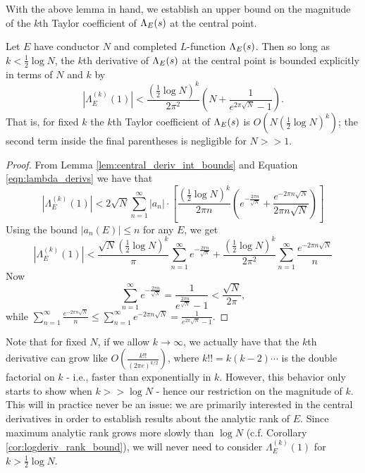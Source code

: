 With the above lemma in hand, we establish an upper bound on the magnitude of the $k$th Taylor coefficient of $\Lambda_E(s)$ at the central point.
\begin{proposition}\label{prop:central_deriv_bounds}
Let $E$ have conductor $N$ and completed $L$-function $\Lambda_E(s)$. Then so long as $k<\frac{1}{2}\log N$, the $k$th derivative of $\Lambda_E(s)$ at the central point is bounded explicitly in terms of $N$ and $k$ by
\begin{equation}
\left| \Lambda_E^{(k)}(1)\right| < \frac{(\frac{1}{2}\log N)^k}{2\pi^2}\left(N + \frac{1}{e^{2\pi\sqrt{N}}-1} \right).
\end{equation}
That is, for fixed $k$ the $k$th Taylor coefficient of $\Lambda_E(s)$ is $O\left( N(\frac{1}{2}\log N)^k\right)$; the second term inside the final parentheses is negligible for $N>>1$.
\end{proposition}

\begin{proof}
From Lemma \ref{lem:central_deriv_int_bounds} and Equation \ref{eqn:lambda_derivs} we have that
\begin{equation*}
\left| \Lambda_E^{(k)}(1)\right| < 2 \sqrt{N} \sum_{n=1}^{\infty} |a_n| \cdot \left[\frac{\left(\frac{1}{2} \log N\right)^{k}}{2\pi n}\left( e^{-\frac{2\pi n}{\sqrt{N}}} + \frac{e^{-2\pi n\sqrt{N}}}{2\pi n \sqrt N} \right)\right]
\end{equation*}
Using the bound $|a_n(E)| \le n$ for any $E$, we get
\begin{equation*}
\left| \Lambda_E^{(k)}(1)\right| < \frac{ \sqrt{N}\left(\frac{1}{2} \log N\right)^{k}}{\pi} \sum_{n=1}^{\infty} e^{-\frac{2\pi n}{\sqrt{N}}} + \frac{\left(\frac{1}{2} \log N\right)^{k}}{2\pi^2} \sum_{n=1}^{\infty} \frac{e^{-2\pi n\sqrt{N}}}{n}
\end{equation*}
Now
\begin{equation*}
\sum_{n=1}^{\infty} e^{-\frac{2\pi n}{\sqrt{N}}} = \frac{1}{e^{\frac{2\pi n}{\sqrt{N}}}-1}< \frac{\sqrt{N}}{2\pi},
\end{equation*}
while $\sum_{n=1}^{\infty} \frac{e^{-2\pi n\sqrt{N}}}{n} \le \sum_{n=1}^{\infty} e^{-2\pi n\sqrt{N}} = \frac{1}{e^{2\pi\sqrt{N}}-1}$.
\end{proof}

Note that for fixed $N$, if we allow $k \to \infty$, we actually have that the $k$th derivative can grow like $O\left(\frac{k!!}{(2\pi e)^{k/2}}\right)$, where $k!! = k(k-2)\cdots$ is the double factorial on $k$ - i.e., faster than exponentially in $k$. However, this behavior only starts to show when $k>>\log N$ - hence our restriction on the magnitude of $k$. This will in practice never be an issue: we are primarily interested in the central derivatives in order to establish results about the analytic rank of $E$. Since maximum analytic rank grows more slowly than $\log N$ (c.f. Corollary \ref{cor:logderiv_rank_bound}), we will never need to consider $\Lambda_E^{(k)}(1)$ for $k> \frac{1}{2}\log N$.